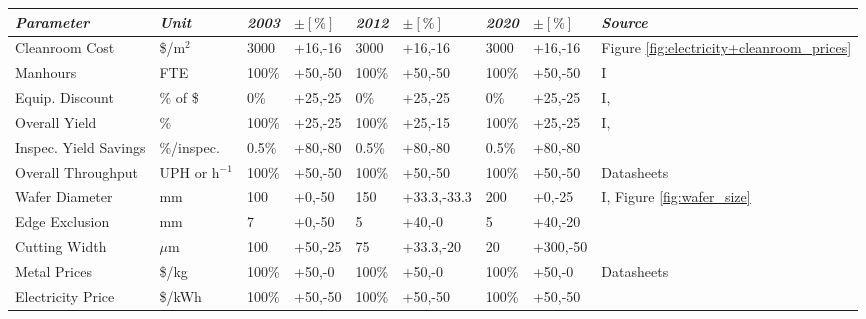 \documentclass[10pt]{article}
\begin{document}
\begin{table}[H]
\small
    \begin{tabularx}{\textwidth}{ |X|l|l|l|l|l|l|l|X|}
        \hline
            \textit{Parameter} & \textit{Unit} & \textit{2003} & $\pm [\%]$ & \textit{2012} & $\pm [\%]$ & \textit{2020} & $\pm [\%]$ & \textit{Source} \\
        \hline
            Cleanroom Cost & \$/m$^2$ & 3000 & +16,-16 & 3000 & +16,-16 & 3000 & +16,-16 & Figure \ref{fig:electricity+cleanroom_prices} \\
        \hline
            Manhours & FTE & 100\% & +50,-50 & 100\% & +50,-50 & 100\% & +50,-50 & I \\
        \hline
            Equip. Discount & \% of \$ & 0\% & +25,-25 & 0\% & +25,-25 & 0\% & +25,-25 & I, \cite{Appleyard2001} \\
        \hline
            Overall Yield & \% & 100\% & +25,-25 & 100\% & +25,-15 & 100\% & +25,-25 & I, \cite{lumi2012yield}\cite{ledsmag2012} \newline \cite{systemplus2015reverse}\cite{ledcomv2} \\
        \hline
            Inspec. Yield Savings & \%/inspec. & 0.5\% & +80,-80 & 0.5\% & +80,-80 & 0.5\% & +80,-80 & \cite{mckinseyyield} \\
        \hline
            Overall Throughput & UPH or h$^{-1}$ & 100\% & +50,-50 & 100\% & +50,-50 & 100\% & +50,-50 & Datasheets \\
        \hline
            Wafer Diameter & mm & 100 & +0,-50 & 150 & +33.3,-33.3 & 200 & +0,-25 & I, Figure \ref{fig:wafer_size} \\
        \hline
            Edge Exclusion & mm & 7 & +0,-50 & 5 & +40,-0 & 5 & +40,-20 & \cite{ledsmagexclusion}\cite{rubiconexclusion} \newline \cite{xiamenexclusion}\cite{american2007annual} \\
        \hline
            Cutting Width & $\mu$m & 100 & +50,-25 & 75 & +33.3,-20 & 20 & +300,-50 & \cite{masaki2000division}\cite{ils2005width} \newline \cite{photonics2010width}\cite{discowidth} \\
        \hline
            Metal Prices & \$/kg & 100\% & +50,-0 & 100\% & +50,-0 & 100\% & +50,-0 & Datasheets \\
        \hline
            Electricity Price & \$/kWh & 100\% & +50,-50 & 100\% & +50,-50 & 100\% & +50,-50 & \cite{eia2000electric}\cite{eia2019electric} \\
        \hline

\end{tabularx}
\end{table}
\end{document}
